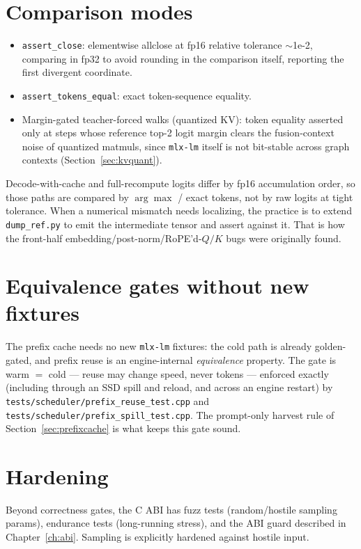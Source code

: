 \documentclass[11pt,a4paper]{report}
\newcommand{\code}[1]{\texttt{#1}}
\begin{document}
\section{Comparison modes}
\begin{itemize}[nosep]
  \item \code{assert\_close}: elementwise allclose at fp16 relative tolerance
        $\sim$1e-2, comparing in fp32 to avoid rounding in the comparison itself,
        reporting the first divergent coordinate.
  \item \code{assert\_tokens\_equal}: exact token-sequence equality.
  \item Margin-gated teacher-forced walks (quantized KV): token equality asserted
        only at steps whose reference top-2 logit margin clears the
        fusion-context noise of quantized matmuls, since \code{mlx-lm} itself is
        not bit-stable across graph contexts (Section~\ref{sec:kvquant}).
\end{itemize}
Decode-with-cache and full-recompute logits differ by fp16 accumulation order, so
those paths are compared by $\arg\max$ / exact tokens, not by raw logits at tight
tolerance. When a numerical mismatch needs localizing, the practice is to extend
\code{dump\_ref.py} to emit the intermediate tensor and assert against it. That is
how the front-half embedding/post-norm/RoPE'd-$Q/K$ bugs were originally found.

\section{Equivalence gates without new fixtures}
The prefix cache needs no new \code{mlx-lm} fixtures: the cold path is already
golden-gated, and prefix reuse is an engine-internal \emph{equivalence} property.
The gate is warm $=$ cold --- reuse may change speed, never tokens --- enforced
exactly (including through an SSD spill and reload, and across an engine
restart) by \code{tests/scheduler/prefix\_reuse\_test.cpp} and
\code{tests/scheduler/prefix\_spill\_test.cpp}. The prompt-only harvest rule of
Section~\ref{sec:prefixcache} is what keeps this gate sound.

\section{Hardening}
Beyond correctness gates, the C ABI has fuzz tests (random/hostile sampling params),
endurance tests (long-running stress), and the ABI guard described in
Chapter~\ref{ch:abi}. Sampling is explicitly hardened against hostile input.
\end{document}
